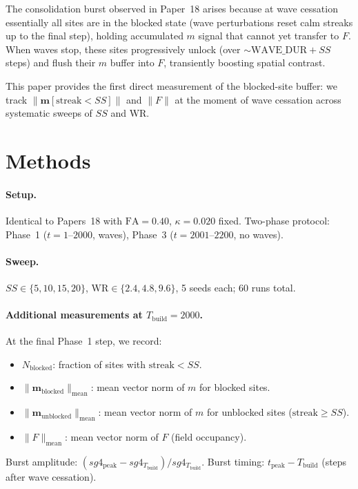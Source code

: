 \documentclass[11pt]{article}
\begin{document}
The consolidation burst observed in Paper~18 arises because at wave cessation
essentially all sites are in the blocked state (wave perturbations reset
calm streaks up to the final step), holding accumulated $m$ signal
that cannot yet transfer to $F$.
When waves stop, these sites progressively unlock (over $\sim \mathrm{WAVE\_DUR} + SS$ steps)
and flush their $m$ buffer into $F$, transiently boosting spatial contrast.

This paper provides the first direct measurement of the blocked-site buffer:
we track $\|\mathbf{m}[\mathrm{streak} < SS]\|$ and $\|F\|$ at the moment of wave cessation
across systematic sweeps of $SS$ and $\mathrm{WR}$.

\section{Methods}

\paragraph{Setup.}
Identical to Papers~18 with $\mathrm{FA}=0.40$, $\kappa=0.020$ fixed.
Two-phase protocol: Phase~1 ($t = 1$--$2000$, waves), Phase~3 ($t = 2001$--$2200$, no waves).

\paragraph{Sweep.}
$SS \in \{5, 10, 15, 20\}$,
$\mathrm{WR} \in \{2.4, 4.8, 9.6\}$,
5 seeds each; 60 runs total.

\paragraph{Additional measurements at $T_{\mathrm{build}} = 2000$.}
At the final Phase~1 step, we record:
\begin{itemize}
  \item $N_{\mathrm{blocked}}$: fraction of sites with $\mathrm{streak} < SS$.
  \item $\|\mathbf{m}_{\mathrm{blocked}}\|_{\mathrm{mean}}$:
    mean vector norm of $m$ for blocked sites.
  \item $\|\mathbf{m}_{\mathrm{unblocked}}\|_{\mathrm{mean}}$:
    mean vector norm of $m$ for unblocked sites ($\mathrm{streak} \geq SS$).
  \item $\|F\|_{\mathrm{mean}}$: mean vector norm of $F$ (field occupancy).
\end{itemize}
Burst amplitude: $(sg4_{\mathrm{peak}} - sg4_{T_{\mathrm{build}}}) / sg4_{T_{\mathrm{build}}}$.
Burst timing: $t_{\mathrm{peak}} - T_{\mathrm{build}}$ (steps after wave cessation).
\end{document}
